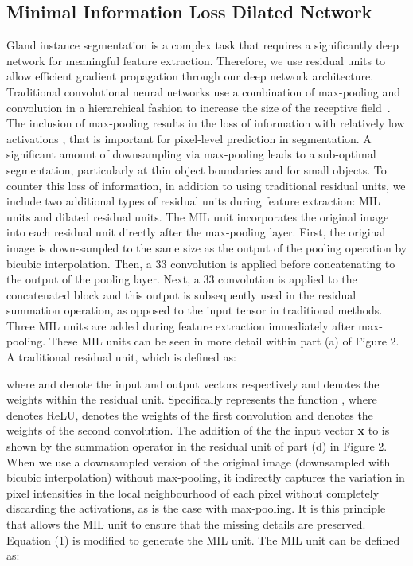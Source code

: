 \documentclass[3p]{elsarticle}
\begin{document}
\subsection{Minimal Information Loss Dilated Network}
Gland instance segmentation is a complex task that requires a significantly deep network for meaningful feature extraction. Therefore, we use residual units to allow efficient gradient propagation through our deep network architecture. Traditional convolutional neural networks use a combination of max-pooling and convolution in a hierarchical fashion to increase the size of the receptive field~\citep{lecun2015deep}. The inclusion of max-pooling results in the loss of information with relatively low activations \citep{sabour2017dynamic}, that is important for pixel-level prediction in segmentation. A significant amount of downsampling via max-pooling leads to a sub-optimal segmentation, particularly at thin object boundaries and for small objects. To counter this loss of information, in addition to using traditional residual units,  we include two additional types of residual units during feature extraction: MIL units and dilated residual units. The MIL unit incorporates the original image into each residual unit directly after the max-pooling layer. First, the original image is down-sampled to the same size as the output of the pooling operation by bicubic interpolation. Then, a 33 convolution is applied before concatenating to the output of the pooling layer. Next, a 33 convolution is applied to the concatenated block and this output is subsequently used in the residual summation operation, as opposed to the input tensor in traditional methods. Three MIL units are added during feature extraction immediately after max-pooling. These MIL units can be seen in more detail within part (a) of Figure 2. A traditional residual unit, which is defined as:



\noindent where  and  denote the input and output vectors respectively and  denotes the weights within the residual unit. Specifically  represents the function , where  denotes ReLU,  denotes the weights of the first convolution and  denotes the weights of the second convolution. The addition of the the input vector \textbf{x} to  is shown by the summation operator  in the residual unit of part (d) in Figure 2. When we use a downsampled version of the original image (downsampled with bicubic interpolation) without max-pooling, it indirectly captures the variation in pixel intensities in the local neighbourhood of each pixel without completely discarding the activations, as is the case with max-pooling. It is this principle that allows the MIL unit to ensure that the missing details are preserved. Equation (1) is modified to generate the MIL unit. The MIL unit can be defined as:
\end{document}
